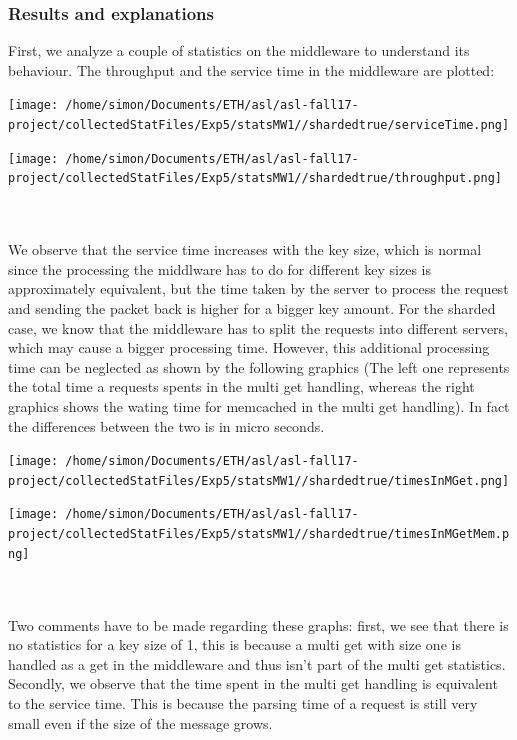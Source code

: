 \documentclass[11pt,a4paper]{article}
\begin{document}
\subsubsection{Results and explanations}
First, we analyze a couple of statistics on the middleware to understand its behaviour. The throughput and the service time in the middleware are plotted:
\\
\begin{minipage}{0.5\linewidth}
\texttt{[image: /home/simon/Documents/ETH/asl/asl-fall17-project/collectedStatFiles/Exp5/statsMW1//shardedtrue/serviceTime.png]}
\end{minipage}
\hfill
\begin{minipage}{0.5\linewidth}
\texttt{[image: /home/simon/Documents/ETH/asl/asl-fall17-project/collectedStatFiles/Exp5/statsMW1//shardedtrue/throughput.png]}
\end{minipage}
\\\\
We observe that the service time increases with the key size, which is normal since the processing the middlware has to do for different key sizes is approximately equivalent, but the time taken by the server to process the request and sending the packet back is higher for a bigger key amount. For the sharded case, we know that the middleware has to split the requests into different servers, which may cause a bigger processing time. However, this additional processing time can be neglected as shown by the following graphics (The left one represents the total time a requests spents in the multi get handling, whereas the right graphics shows the wating time for memcached in the multi get handling). In fact the differences between the two is in micro seconds. 
\\
\begin{minipage}{0.5\linewidth}
\texttt{[image: /home/simon/Documents/ETH/asl/asl-fall17-project/collectedStatFiles/Exp5/statsMW1//shardedtrue/timesInMGet.png]}
\end{minipage}
\hfill
\begin{minipage}{0.5\linewidth}
\texttt{[image: /home/simon/Documents/ETH/asl/asl-fall17-project/collectedStatFiles/Exp5/statsMW1//shardedtrue/timesInMGetMem.png]}
\end{minipage}
\\\\
Two comments have to be made regarding these graphs: first, we see that there is no statistics for a key size of 1, this is because a multi get with size one is handled as a get in the middleware and thus isn't part of the multi get statistics. Secondly, we observe that the time spent in the multi get handling is equivalent to the service time. This is because the parsing time of a request is still very small even if the size of the message grows.
\end{document}
